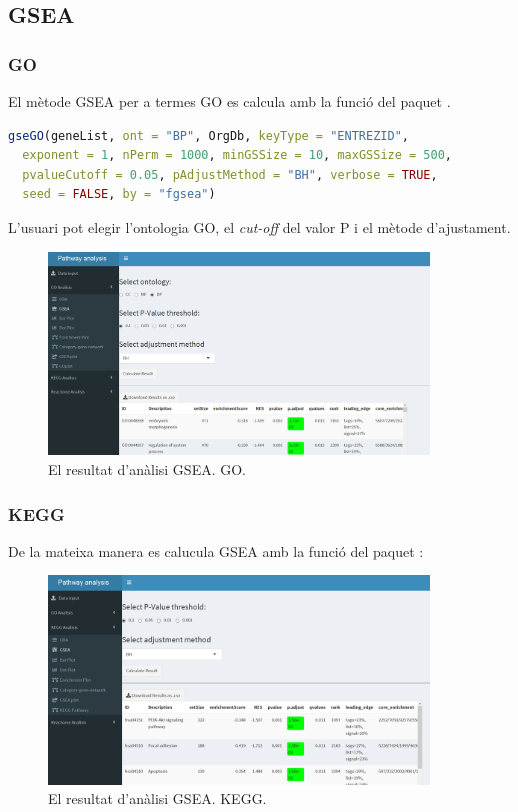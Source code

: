 \documentclass[]{article}
\begin{document}
\subsection{GSEA}
\subsubsection{GO}
El mètode GSEA per a termes GO es calcula amb la funció  del paquet . 

\begin{lstlisting}[language=R]
gseGO(geneList, ont = "BP", OrgDb, keyType = "ENTREZID",
  exponent = 1, nPerm = 1000, minGSSize = 10, maxGSSize = 500,
  pvalueCutoff = 0.05, pAdjustMethod = "BH", verbose = TRUE,
  seed = FALSE, by = "fgsea")
\end{lstlisting}

L'usuari pot elegir l'ontologia GO, el \textit{cut-off} del valor P i el mètode d'ajustament.
\begin{figure}[H]
\centering
\includegraphics[width=0.9\textwidth]{App_F11_Items_GO_GSEA.png}  
\caption{El resultat d'anàlisi GSEA. GO.}
\end{figure}

\subsubsection{KEGG}
De la mateixa manera es calucula GSEA amb la funció  del paquet :

\begin{figure}[H]
\centering
\includegraphics[width=0.9\textwidth]{App_F12_Items_KEGG_GSEA.png}  
\caption{El resultat d'anàlisi GSEA. KEGG.}
\end{figure}
\end{document}
